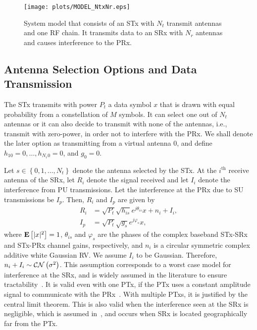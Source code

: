 \documentclass[12pt,draftcls,peerreview,onecolumn]{IEEEtran}
\newcommand{\CN}{{\cal CN}}
\newcommand{\ie}{{i.e.}}
\newcommand{\expect}[1]{{\bf{E}}\left[{#1}\right]}
\newcommand{\nx}{{0}}
\newcommand{\Nt}{{N_t}}
\newcommand{\Nr}{{N_r}}
\newcommand{\Pt}{{P_t}}
\newcommand{\such}{h}
\newcommand{\puch}{g}
\newcommand{\hk}[1]{{\such_{#1}}}
\newcommand{\gk}[1]{{\puch_{#1}}}
\newcommand{\Rsrx}{R_{i}}
\newcommand{\Iprx}{I_{p}}
\newcommand{\Isrx}{I_{i}}
\newcommand{\noise}{n_i}
\newcommand{\noisevar}{\sigma^2}
\newcommand{\allopts}{\left\{\nx,1,\ldots,\Nt\right\}}
\newcommand{\suchph}{\theta}
\newcommand{\puchph}{\varphi}
\newcommand{\thetahk}{\suchph_{is}}
\newcommand{\thetagk}{\puchph_{s}}
\newcommand{\ith}{i^{\text{th}}}
\begin{document}
\begin{figure}
\centering 
\texttt{[image: plots/MODEL\_NtxNr.eps]}
\caption{System model that consists of an STx with $\Nt$ transmit antennas and one RF chain. It transmits data to an SRx with $\Nr$ antennas and causes interference to the PRx.}
\label{fig:MODEL}
\end{figure}
\newcommand{\hs}{\mathbf{\such}_{s}}
\newcommand{\hsstar}{\mathbf{\such}_{s^{*}}}
\subsection{Antenna Selection Options and Data Transmission}
The STx transmits with power $\Pt$ a data symbol $x$ that is drawn with equal probability from a constellation of $M$ symbols. It can select one out of $\Nt$ antennas or it can also decide to transmit with none of the antennas, \ie, transmit with zero-power, in order not to interfere with the PRx. We shall denote the later option as transmitting from a virtual antenna $\nx$, and define $\hk{1\nx} = 0,\ldots,\hk{\Nr\nx} = 0$, and $\gk{\nx}= 0$. 

Let $s\in\allopts$ denote the antenna selected by the STx. %
 At the $\ith$ receive antenna of the SRx, let $\Rsrx$ denote the signal received and let $\Isrx$ denote the interference from PU transmissions. Let the interference at the PRx due to SU transmissions be $\Iprx$. Then, $\Rsrx$ and $\Iprx$ are given by
%
\begin{align}
\label{eq:r_su}
 \Rsrx &= \sqrt{\Pt}\sqrt{\hk{is}} e^{j\thetahk}x + \noise + \Isrx, \\
 \label{eq:i}
 \Iprx &= \sqrt{\Pt}\sqrt{\gk{s}} e^{j\thetagk}x ,
\end{align}
%
where $\expect{|x|^2}=1$, $\thetahk$ and $\thetagk$ are the phases of the complex baseband STx-SRx and STx-PRx channel gains, respectively, and $\noise$ is a circular symmetric complex additive white Gaussian RV. We assume $\Isrx$ to be Gaussian. Therefore, $\noise + \Isrx\sim \CN\left(\noisevar\right)$. This assumption corresponds to a worst case model for interference at the SRx, and is widely assumed in the literature to ensure tractability~\cite{Sarvendranath_2013_TCOM,Wang_2011_TCom, Kashyap_2014_TCOM,Sarvendranath_2014_TCOM}. It is valid even with one PTx, if the PTx uses a constant amplitude signal to communicate with the PRx~\cite{Kashyap_2014_TCOM}. With multiple PTxs, it is justified by the central limit theorem. This is also valid when the interference seen at the SRx is negligible, which is assumed in~\cite{Zhou_2009_WCNC,musavian_2009_tcom,RZhang_2009_TWC,li_2011_pimrc,Sboui_2013_TWC}, and occurs when SRx is located geographically far from the PTx.
\end{document}
